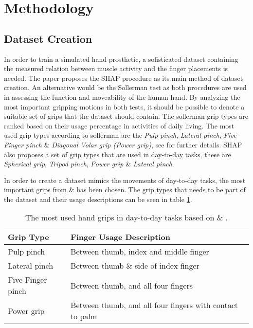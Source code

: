 \documentclass[../main.tex]{subfiles}
\begin{document}
\section{Methodology}

\subsection{Dataset Creation}

In order to train a simulated hand prosthetic, a sofisticated dataset containing the measured relation between muscle activity and the finger placements is needed.
The paper \cite{KeunTaeKim2021} proposes the SHAP procedure \cite{shap} as its main method of dataset creation.
An alternative would be the Sollerman test \cite{sollerman} as both procedures are used in assessing the function and moveability of the human hand.
By analyzing the most important gripping motions in both tests, it should be possible to denote a suitable set of grips that the dataset should contain.
The sollerman grip types are ranked based on their usage percentage in activities of daily living.
The most used grip types according to sollerman are the \textit{Pulp pinch}, \textit{Lateral pinch}, \textit{Five-Finger pinch} \& \textit{Diagonal Volar grip (Power grip)}, see \cite{sollerman} for further details.
SHAP also proposes a set of grip types that are used in day-to-day tasks, these are \textit{Spherical grip}, \textit{Tripod pinch}, \textit{Power grip} \& \textit{Lateral pinch}.

In order to create a dataset mimics the movements of day-to-day tasks, the most important grips from \cite{sollerman} \& \cite{shap} has been chosen.
The grip types that needs to be part of the dataset and their usage descriptions can be seen in table \ref{tab:grips}.

\begin{table}[h]
\begin{center}
\begin{tabular}{ |l|l| } 
 \hline
 Grip Type & Finger Usage Description \\ 
 \hline
 Pulp pinch & Between thumb, index and middle finger \\ 
 Lateral pinch & Between thumb \& side of index finger \\ 
 Five-Finger pinch & Between thumb, and all four fingers \\ 
 Power grip & Between thumb, and all four fingers with contact to palm \\ 
 \hline
\end{tabular}
\caption{The most used hand grips in day-to-day tasks based on \cite{sollerman} \& \cite{shap}.}
\label{tab:grips}
\end{center}
\end{table}
\end{document}
